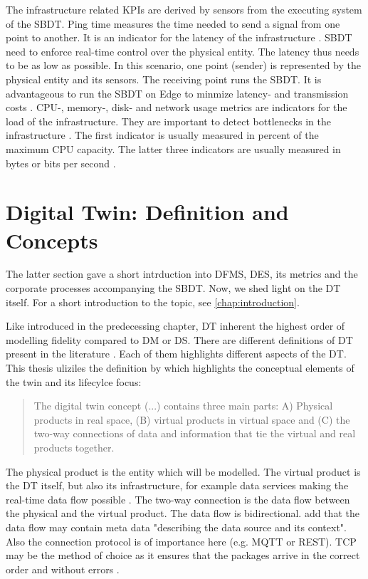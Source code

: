 The infrastructure related KPIs are derived by sensors from the executing system of the SBDT. Ping time measures the time needed to send a signal from one point to another. It is an indicator for the latency of the infrastructure \parencite{wu2021digital}. SBDT need to enforce real-time control over the physical entity. The latency thus needs to be as low as possible. In this scenario, one point (sender) is represented by the physical entity and its sensors. The receiving point runs the SBDT. It is advantageous to run the SBDT on Edge to minmize latency- and transmission costs \parencite{li2018learning}. CPU-, memory-, disk- and network usage metrics are indicators for the load of the infrastructure. They are important to detect bottlenecks in the infrastructure \parencite{li2018learning}. The first indicator is usually measured in percent of the maximum CPU capacity. The latter three indicators are usually measured in bytes or bits per second \parencite{granelli2021evaluating}.


\section{Digital Twin: Definition and Concepts}
\label{sec:digital-twin}
The latter section gave a short intrduction into DFMS, DES, its metrics and the corporate processes accompanying the SBDT. Now, we shed light on the DT itself. For a short introduction to the topic, see \autoref{chap:introduction}.

Like introduced in the predecessing chapter, DT inherent the highest order of modelling fidelity compared to DM or DS. There are different definitions of DT present in the literature \parencite{Negri2017promfg,zheng2019application,glaessgen2012digital,Demkovich2018def,boschert2016digital,grieves2014digital,kritzinger2018digital,Tao2018ijamt,zehnder2018representing}. Each of them highlights different aspects of the DT. This thesis uliziles the definition by \autocite{grieves2014digital} which highlights the conceptual elements of the twin and its lifecylce focus:

\begin{quote}
  The digital twin concept (...) contains three main parts: A) Physical products in real space, (B) virtual products in virtual space and (C) the two-way connections of data and information that tie the virtual and real products together. \autocite{grieves2014digital}
\end{quote}

The physical product is the entity which will be modelled. The virtual product is the DT itself, but also its infrastructure, for example data services making the real-time data flow possible \parencite{Tao2018ijamt}. The two-way connection is the data flow between the physical and the virtual product. The data flow is bidirectional. \citeauthor{zehnder2018representing} add that the data flow may contain meta data "describing the data source and its context". Also the connection protocol is of importance here (e.g. MQTT or REST). TCP may be the method of choice as it ensures that the packages arrive in the correct order and without errors \parencite{li2018learning}.

